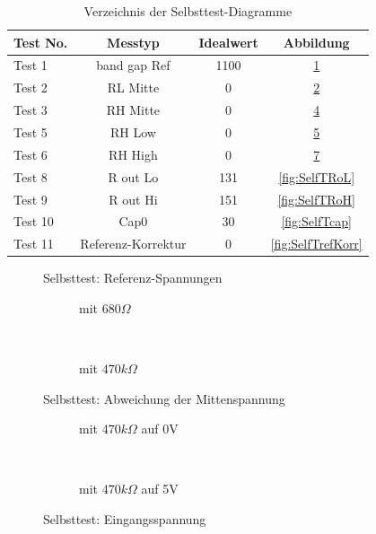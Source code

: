 \begin{table}[H]
  \begin{center}
    \begin{tabular}{| l | c | c | c |}
    \hline
Test No. &  Messtyp    & Idealwert & Abbildung \\
    \hline
    \hline
Test 1 & band gap Ref  & 1100 & \ref{fig:SelfTref} \\
    \hline
Test 2 & RL Mitte & 0 & \ref{fig:SelfTMitL} \\
    \hline
Test 3 & RH Mitte & 0 & \ref{fig:SelfTMitH} \\
    \hline
Test 5 & RH Low &  0 & \ref{fig:SelfTlowH} \\
    \hline
Test 6 & RH High & 0 & \ref{fig:SelfTtopH} \\
    \hline
Test 8 & R out Lo & 131 & \ref{fig:SelfTRoL} \\
    \hline
Test 9 & R out Hi & 151 & \ref{fig:SelfTRoH} \\
    \hline
Test 10 & Cap0  & 30 & \ref{fig:SelfTcap} \\
    \hline
Test 11 & Referenz-Korrektur  & 0 & \ref{fig:SelfTrefKorr} \\
    \hline
    \end{tabular}
  \end{center}
  \caption{Verzeichnis der Selbsttest-Diagramme}
  \label{tab:test_m168} 
\end{table}

\begin{figure}[H]
  \centering
  
  \caption{Selbsttest: Referenz-Spannungen}
  \label{fig:SelfTref}
\end{figure}

\begin{figure}[H]
  \begin{subfigure}[b]{9cm}
    \centering
    \resizebox{9cm}{!}{}
    \caption{mit \(680 \Omega\)}
    \label{fig:SelfTMitL}
  \end{subfigure}
  ~
  \begin{subfigure}[b]{9cm}
    \centering
    \resizebox{9cm}{!}{}
    \caption{mit \(470 k\Omega\)}
    \label{fig:SelfTMitH}
  \end{subfigure}
  \caption{Selbsttest: Abweichung der Mittenspannung}
\end{figure}

\begin{figure}[H]
  \begin{subfigure}[b]{9cm}
  \centering
    \resizebox{9cm}{!}{}
    \caption{mit \(470 k\Omega\) auf 0V}
    \label{fig:SelfTlowH}
  \end{subfigure}
  ~
  \begin{subfigure}[b]{9cm}
  \centering
    \resizebox{9cm}{!}{}
    \caption{mit \(470 k\Omega\) auf 5V}
    \label{fig:SelfTtopH}
  \end{subfigure}
  \caption{Selbsttest: Eingangsspannung}
\end{figure}


